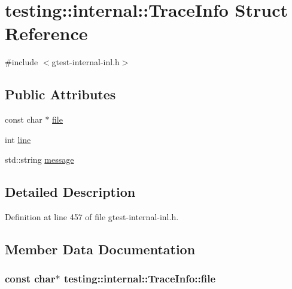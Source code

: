 \hypertarget{structtesting_1_1internal_1_1_trace_info}{}\section{testing\+:\+:internal\+:\+:Trace\+Info Struct Reference}
\label{structtesting_1_1internal_1_1_trace_info}


{\ttfamily \#include $<$gtest-\/internal-\/inl.\+h$>$}

\subsection*{Public Attributes}
\begin{DoxyCompactItemize}
\item 
const char $\ast$ \hyperlink{structtesting_1_1internal_1_1_trace_info_a5d801209d3c0840aa55cfd4b67504254}{file}
\item 
int \hyperlink{structtesting_1_1internal_1_1_trace_info_ae9d269de1b77f4a3180d0d34acb4d7ff}{line}
\item 
std\+::string \hyperlink{structtesting_1_1internal_1_1_trace_info_a39e74f39ce6d5fdbac799abdb1c27f90}{message}
\end{DoxyCompactItemize}


\subsection{Detailed Description}


Definition at line 457 of file gtest-\/internal-\/inl.\+h.



\subsection{Member Data Documentation}
\subsubsection[{\texorpdfstring{file}{file}}]{\setlength{\rightskip}{0pt plus 5cm}const char$\ast$ testing\+::internal\+::\+Trace\+Info\+::file}\hypertarget{structtesting_1_1internal_1_1_trace_info_a5d801209d3c0840aa55cfd4b67504254}{}\label{structtesting_1_1internal_1_1_trace_info_a5d801209d3c0840aa55cfd4b67504254}


